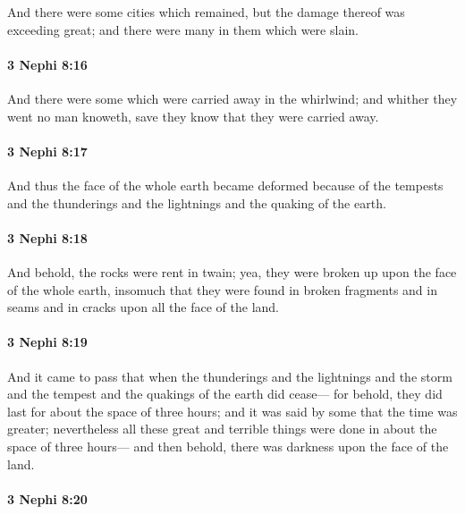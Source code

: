 			And there were some cities which remained,
			but the damage thereof was exceeding great;
			and there were many in them which were slain.

		\paragraph{3 Nephi 8:16} %
			\label{3NEPHI-8-16}

			And there were some which were carried away in the whirlwind;
			and whither they went no man knoweth,
			save they know that they were carried away.

		\paragraph{3 Nephi 8:17} %
			\label{3NEPHI-8-17}

			And thus the face of the whole earth became deformed
			because of the tempests and the thunderings and the lightnings
			and the quaking of the earth.

		\paragraph{3 Nephi 8:18} %
			\label{3NEPHI-8-18}

			And behold, the rocks were rent in twain;
			yea, they were broken up upon the face of the whole earth,
			insomuch that they were found in broken fragments
			and in seams and in cracks upon all the face of the land.

		\paragraph{3 Nephi 8:19} %
			\label{3NEPHI-8-19}

			And it came to pass that when the thunderings and the lightnings
			and the storm and the tempest and the quakings of the earth did cease---
			for behold, they did last for about the space of three hours;
			and it was said by some that the time was greater;
			nevertheless all these great and terrible things were done
			in about the space of three hours---
			and then behold, there was darkness upon the face of the land.

		\paragraph{3 Nephi 8:20} %
			\label{3NEPHI-8-20}

